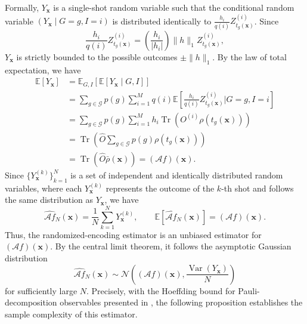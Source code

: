 \documentclass[%
 reprint,
 amsmath,amssymb,
 aps,
 pra,
]{revtex4-2}
\theoremstyle{definition}
\begin{document}
Formally, \(Y_{\bm{x}}\) is a single-shot random variable such that the conditional random variable \((Y_{\bm{x}} \mid G=g, I=i)\) is distributed identically to \(\frac{h_i}{q(i)} Z_{t_g(\bm{x})}^{(i)}\). Since
\begin{equation}
\frac{h_i}{q(i)} Z_{t_g(\bm{x})}^{(i)}
= \left( \frac{h_i}{|h_i|} \right) \|h\|_1 Z_{t_g(\bm{x})}^{(i)},
\end{equation}
\(Y_{\bm{x}}\) is strictly bounded to the possible outcomes \(\pm\|h\|_1\). By the law of total expectation, we have
\begin{equation}
\begin{aligned}
\mathbb{E}\left[Y_{\bm{x}}\right]
&= \mathbb{E}_{G, I}\left[ \mathbb{E}\left[ Y_{\bm{x}} \mid G, I \right] \right] \\
&= \sum_{g \in \mathcal{G}} p(g) \sum_{i=1}^M q(i) \mathbb{E}\left[ \frac{h_i}{q(i)} Z_{t_g(\bm{x})}^{(i)} \mathrel{\Bigg|} G=g, I=i \right] \\
&= \sum_{g \in \mathcal{G}} p(g) \sum_{i=1}^M h_i \operatorname{Tr}(O^{(i)} \rho(t_g(\bm{x}))) \\
&= \operatorname{Tr}\left(\hat{O} \sum_{g \in \mathcal{G}} p(g) \rho(t_g(\bm{x}))\right) \\
&= \operatorname{Tr}(\hat{O} \bar{\rho}(\bm{x})) = (\mathcal{A} f)(\bm{x}).
\end{aligned}
\end{equation}
Since \(\{Y_{\bm{x}}^{(k)}\}_{k=1}^N\) is a set of independent and identically distributed random variables, where each \(Y_{\bm{x}}^{(k)}\) represents the outcome of the \(k\)-th shot and follows the same distribution as \(Y_{\bm{x}}\), we have
\begin{equation}
\widehat{\mathcal{A}f}_N(\bm{x}) = \frac{1}{N} \sum_{k=1}^N Y_{\bm{x}}^{(k)},
\qquad
\mathbb{E}\left[\widehat{\mathcal{A}f}_N(\bm{x})\right] = (\mathcal{A} f)(\bm{x}).
\end{equation}
Thus, the randomized-encoding estimator is an unbiased estimator for \((\mathcal{A} f)(\bm{x})\). By the central limit theorem, it follows the asymptotic Gaussian distribution
\begin{equation}
\widehat{\mathcal{A}f}_N(\bm{x})
\sim
\mathcal{N}\!\left((\mathcal{A}f)(\bm{x}), \frac{\operatorname{Var}(Y_{\bm{x}})}{N}\right)
\end{equation}
for sufficiently large \(N\). Precisely, with the Hoeffding bound for Pauli-decomposition observables presented in \cite{Gresch2025}, the following proposition establishes the sample complexity of this estimator.
\end{document}

